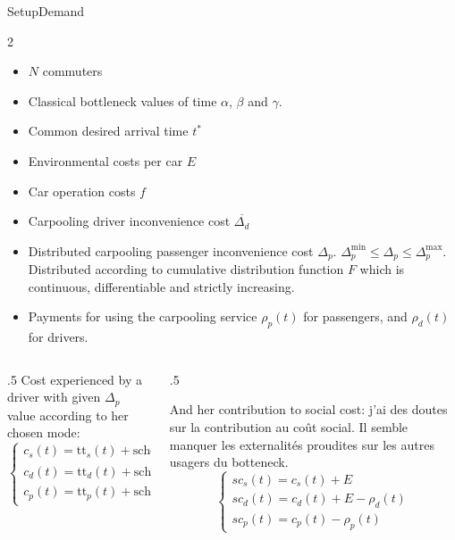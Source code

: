 \documentclass[english, 9pt, aspectratio=169]{beamer}
\begin{document}
\begin{frame}{Setup}{Demand}
\begin{multicols}{2}
\begin{itemize}
    \item $N$ commuters
    \item Classical bottleneck values of time $\alpha$, $\beta$ and $\gamma$.
    \item Common desired arrival time $t^*$
    \item Environmental costs per car $E$
    \item Car operation costs $f$
    \item Carpooling driver inconvenience cost $\overline{\Delta _d}$
    \item Distributed carpooling passenger inconvenience cost $\Delta _p$. $\Delta _p^{\text{min}} \leq \Delta _p \leq \Delta _p^{\text{max}}$. Distributed according to cumulative distribution function $F$ which is continuous, differentiable and strictly increasing.
    \item Payments for using the carpooling service $\rho _p (t)$ for passengers, and $\rho _d(t)$ for drivers.
\end{itemize}
\end{multicols}

\vfill
\hrulefill
\vfill

\begin{columns}
\begin{column}{.5\textwidth}
Cost experienced by a driver with given $\Delta _p$ value according to her chosen mode:
\begin{equation*}
    \left\{
    \begin{array}{l}
        c_s(t) = \text{tt}_s(t) + \text{sched}_s(t) + f\\
        c_d(t) = \text{tt}_d(t) + \text{sched}_d(t) + f + \overline{\Delta _d} + \rho _d (t)\\
        c_p(t) = \text{tt}_p(t) + \text{sched}_p(t) + \Delta _p + \rho _p (t)
    \end{array}
    \right.
\end{equation*}
\end{column}
\begin{column}{.5\textwidth}

And her contribution to social cost: \alert{j'ai des doutes sur la contribution au coût social. Il semble manquer les externalités proudites sur les autres usagers du botteneck.}
\begin{equation*}
    \left\{
    \begin{array}{l}
        sc_s(t) = c_s(t) + E\\
        sc_d(t) = c_d(t) + E - \rho _d (t)\\
        sc_p(t) = c_p(t) - \rho _p(t)
    \end{array}
    \right.
\end{equation*}
    
\end{column}

\end{columns}
    
\end{frame}
\end{document}
